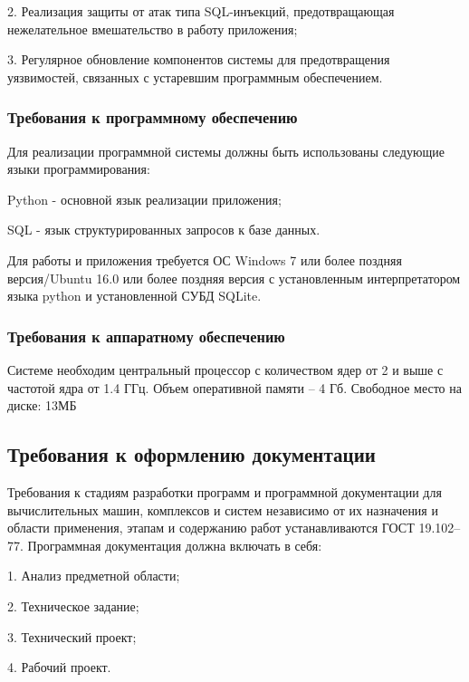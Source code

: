 2. Реализация защиты от атак типа SQL-инъекций, предотвращающая нежелательное вмешательство в работу приложения;

3. Регулярное обновление компонентов системы для предотвращения уязвимостей, связанных с устаревшим программным обеспечением.

\subsubsection{Требования к программному обеспечению}
Для реализации программной системы должны быть использованы следующие языки программирования: 

Python - основной язык реализации приложения; 

SQL - язык структурированных запросов к базе данных.

Для работы и приложения требуется ОС Windows 7 или более поздняя версия/Ubuntu 16.0 или более поздняя версия с установленным интерпретатором языка python и установленной СУБД SQLite.

\subsubsection{Требования к аппаратному обеспечению}
Системе необходим центральный процессор с количеством ядер от 2 и выше с частотой ядра от 1.4 ГГц. Объем оперативной памяти – 4 Гб.
Свободное место на диске: 13МБ

\subsection{Требования к оформлению документации}

Требования к стадиям разработки программ и программной документации для вычислительных машин, комплексов и систем независимо от их
назначения и области применения, этапам и содержанию работ устанавливаются ГОСТ 19.102–77. Программная документация должна включать в себя:

1. Анализ предметной области;

2. Техническое задание;

3. Технический проект;

4. Рабочий проект.

